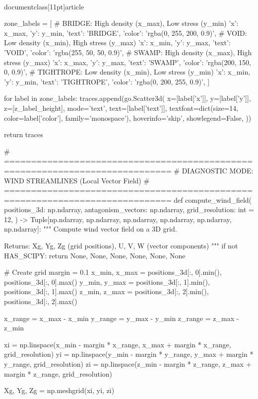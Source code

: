 \\documentclass[11pt]{article}
\begin{document}
\begin{CodeBlock}
{{    zone_labels = [
        # BRIDGE: High density (x_max), Low stress (y_min)
        {'x': x_max, 'y': y_min, 'text': 'BRIDGE', 'color': 'rgba(0, 255, 200, 0.9)'},
        # VOID: Low density (x_min), High stress (y_max)
        {'x': x_min, 'y': y_max, 'text': 'VOID', 'color': 'rgba(255, 50, 50, 0.9)'},
        # SWAMP: High density (x_max), High stress (y_max)
        {'x': x_max, 'y': y_max, 'text': 'SWAMP', 'color': 'rgba(200, 150, 0, 0.9)'},
        # TIGHTROPE: Low density (x_min), Low stress (y_min)
        {'x': x_min, 'y': y_min, 'text': 'TIGHTROPE', 'color': 'rgba(0, 200, 255, 0.9)'},
    ]

    for label in zone_labels:
        traces.append(go.Scatter3d(
            x=[label['x']],
            y=[label['y']],
            z=[z_label_height],
            mode='text',
            text=[label['text']],
            textfont=dict(size=14, color=label['color'], family='monospace'),
            hoverinfo='skip',
            showlegend=False,
        ))

    return traces



# =============================================================================
# DIAGNOSTIC MODE: WIND STREAMLINES (Local Vector Field)
# =============================================================================
def compute_wind_field(
    positions_3d: np.ndarray,
    antagonism_vectors: np.ndarray,
    grid_resolution: int = 12,
) -> Tuple[np.ndarray, np.ndarray, np.ndarray, np.ndarray, np.ndarray, np.ndarray]:
    """
    Compute wind vector field on a 3D grid.

    Returns: Xg, Yg, Zg (grid positions), U, V, W (vector components)
    """
    if not HAS_SCIPY:
        return None, None, None, None, None, None

    # Create grid
    margin = 0.1
    x_min, x_max = positions_3d[:, 0].min(), positions_3d[:, 0].max()
    y_min, y_max = positions_3d[:, 1].min(), positions_3d[:, 1].max()
    z_min, z_max = positions_3d[:, 2].min(), positions_3d[:, 2].max()

    x_range = x_max - x_min
    y_range = y_max - y_min
    z_range = z_max - z_min

    xi = np.linspace(x_min - margin * x_range, x_max + margin * x_range, grid_resolution)
    yi = np.linspace(y_min - margin * y_range, y_max + margin * y_range, grid_resolution)
    zi = np.linspace(z_min - margin * z_range, z_max + margin * z_range, grid_resolution)

    Xg, Yg, Zg = np.meshgrid(xi, yi, zi)

}}
\end{CodeBlock}
\end{document}
